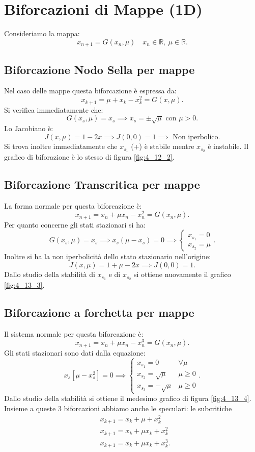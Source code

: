 \section{Biforcazioni di Mappe (1D)}%
Consideriamo la mappa:
\[
    x_{n+1}=G(x_n, \mu) \quad  x_n \in \mathbb{R}, \ \mu  \in \mathbb{R}
.\] 
\subsection{Biforcazione Nodo Sella per mappe}%
Nel caso delle mappe questa biforcazione è espressa da:
\[
    x_{k+1}= \mu  + x_k -x_k^2 = G(x, \mu) 
.\] 
Si verifica immediatamente che:
\[
    G(x_s, \mu) = x_s \implies  x_s = \pm \sqrt{\mu} \text{ con }\mu >0
.\] 
Lo Jacobiano è:
\[
    J(x, \mu) = 1-2x \implies  J(0, 0) = 1 \implies  \text{ Non iperbolico}
.\] 
Si trova inoltre immediatamente che $x_{s_1}$ (+) è stabile mentre $x_{s_2}$ è instabile. Il grafico di biforazione è lo stesso di figura \ref{fig:4_12_2}.
\subsection{Biforcazione Transcritica per mappe}%
La forma normale per questa biforcazione è:
\[
    x_{n+1}=x_n + \mu x_n - x_n^2 = G(x_n, \mu) 
.\] 
Per quanto concerne gli stati stazionari si ha:
\[
    G(x_s, \mu) = x_s \implies  x_s(\mu-x_s) = 0 \implies 
    \begin{cases}
        x_{s_1}= 0\\
	x_{s_2}= \mu
    \end{cases}
.\] 
Inoltre si ha la non iperbolicità dello stato stazionario nell'origine:
\[
    J(x, \mu) = 1+\mu-2x \implies  J(0, 0) = 1
.\] 
Dallo studio della stabilità di $x_{s_1}$ e di $x_{s_2}$ si ottiene nuovamente il grafico \ref{fig:4_13_3}.
\subsection{Biforcazione a forchetta per mappe}%
Il sistema normale per questa biforcazione è:
\[
    x_{n+1}= x_n + \mu x_n -x_n^3 = G(x_n, \mu) 
.\] 
Gli stati stazionari sono dati dalla equazione:
\[
    x_s\left[\mu-x_s^2\right]= 0 \implies 
    \begin{cases}
	x_{s_1}=0 & \forall \mu\\
	x_{s_2}=\sqrt{\mu} & \mu\ge 0\\
	x_{s_3}= -\sqrt{\mu} & \mu\ge 0
    \end{cases}
.\] 
Dallo studio della stabilità si ottiene il medesimo grafico di figura \ref{fig:4_13_4}.\\
Insieme a queste 3 biforcazioni abbiamo anche le speculari: le subcritiche
\[\begin{aligned}
    &x_{k+1}= x_k + \mu +x_k^2\\
    &x_{k+1}= x_k + \mu x_k + x_k^2\\
    &x_{k+1}= x_k + \mu x_k +x_k^3
.\end{aligned}\]

